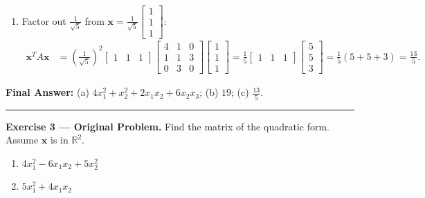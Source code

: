 \documentclass[11pt, letterpaper]{article}
\theoremstyle{definition}
\theoremstyle{remark}
\newcommand{\R}{\mathbb{R}}
\begin{document}
\begin{enumerate}[label=\alph*.]
\begin{align*}
    &= \begin{bmatrix} -3 & -1 & 4 \end{bmatrix} \begin{bmatrix} -13 \\ 8 \\ -3 \end{bmatrix} = (-3)(-13) + (-1)(8) + (4)(-3) = 39 - 8 - 12 = 19.
    \end{align*}
    (Check via part (a): $4(-3)^2 + (-1)^2 + 2(-3)(-1) + 6(-1)(4) = 36 + 1 + 6 - 24 = 19$.)
    \item Factor out $\frac{1}{\sqrt{5}}$ from $\mathbf{x} = \frac{1}{\sqrt{5}} \begin{bmatrix} 1 \\ 1 \\ 1 \end{bmatrix}$:
    \begin{align*}
    \mathbf{x}^T A \mathbf{x} &= \left(\frac{1}{\sqrt{5}}\right)^2 \begin{bmatrix} 1 & 1 & 1 \end{bmatrix} \begin{bmatrix} 4 & 1 & 0 \\ 1 & 1 & 3 \\ 0 & 3 & 0 \end{bmatrix} \begin{bmatrix} 1 \\ 1 \\ 1 \end{bmatrix} = \frac{1}{5} \begin{bmatrix} 1 & 1 & 1 \end{bmatrix} \begin{bmatrix} 5 \\ 5 \\ 3 \end{bmatrix} = \frac{1}{5}(5 + 5 + 3) = \frac{13}{5}.
    \end{align*}
\end{enumerate}

\textbf{Final Answer:} (a) $4x_1^2 + x_2^2 + 2x_1x_2 + 6x_2x_3$; \quad (b) $19$; \quad (c) $\frac{13}{5}$.

\medskip
\hrule
\medskip

\textbf{Exercise 3 --- Original Problem.} Find the matrix of the quadratic form. Assume $\mathbf{x}$ is in $\R^2$.
\begin{enumerate}[label=\alph*.]
    \item $4x_1^2 - 6x_1x_2 + 5x_2^2$
    \item $5x_1^2 + 4x_1x_2$
\end{enumerate}
\end{document}
